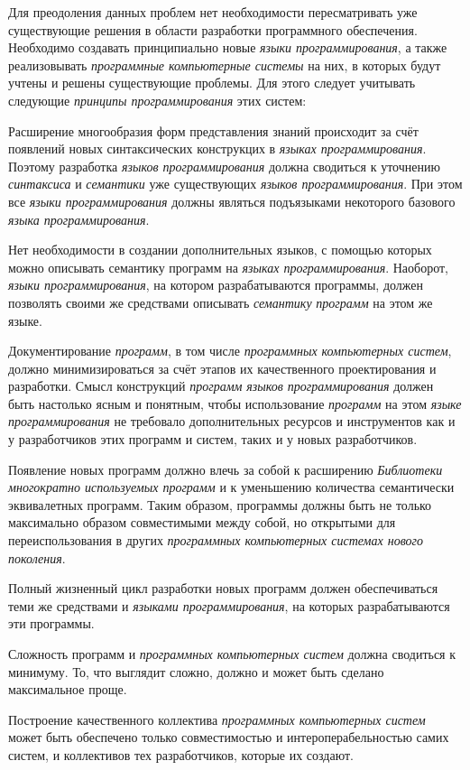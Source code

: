 Для преодоления данных проблем нет необходимости пересматривать уже существующие решения в области разработки программного обеспечения. Необходимо создавать принципиально новые \textit{языки программирования}, а также реализовывать \textit{программные компьютерные системы} на них, в которых будут учтены и решены существующие проблемы. Для этого следует учитывать следующие \textit{принципы программирования} этих систем:
\begin{textitemize}
	\item Расширение многообразия форм представления знаний происходит за счёт появлений новых синтаксических конструкцих в \textit{языках программирования}. Поэтому разработка \textit{языков программирования} должна сводиться к уточнению \textit{синтаксиса} и \textit{семантики} уже существующих \textit{языков программирования}. При этом все \textit{языки программирования} должны являться подъязыками некоторого базового \textit{языка программирования}.
	\item Нет необходимости в создании дополнительных языков, с помощью которых можно описывать семантику программ на \textit{языках программирования}. Наоборот, \textit{языки программирования}, на котором разрабатываются программы, должен позволять своими же средствами описывать \textit{семантику} \textit{программ} на этом же языке.
	\item Документирование \textit{программ}, в том числе \textit{программных компьютерных систем}, должно минимизироваться за счёт этапов их качественного проектирования и разработки. Смысл конструкций \textit{программ} \textit{языков программирования} должен быть настолько ясным и понятным, чтобы использование \textit{программ} на этом \textit{языке программирования} не требовало дополнительных ресурсов и инструментов как и у разработчиков этих программ и систем, таких и у новых разработчиков.
	\item Появление новых программ должно влечь за собой к расширению \textit{Библиотеки многократно используемых программ} и к уменьшению количества семантически эквивалетных программ. Таким образом, программы должны быть не только максимально образом совместимыми между собой, но открытыми для переиспользования в других \textit{программных компьютерных системах нового поколения}.
	\item Полный жизненный цикл разработки новых программ должен обеспечиваться теми же средствами и \textit{языками программирования}, на которых разрабатываются эти программы.
	\item Сложность программ и \textit{программных компьютерных систем} должна сводиться к минимуму. То, что выглядит сложно, должно и может быть сделано максимальное проще. 
	\item Построение качественного коллектива \textit{программных компьютерных систем} может быть обеспечено только совместимостью и интероперабельностью самих систем, и коллективов тех разработчиков, которые их создают.
\end{textitemize}

